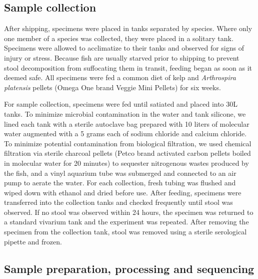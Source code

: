 





\subsection{Sample collection}

After shipping, specimens were placed in tanks separated by species. Where only one member of a species was collected, they were placed in a solitary tank. Specimens were allowed to acclimatize to their tanks and observed for signs of injury or stress. Because fish are usually starved prior to shipping to prevent stool decomposition from suffocating them in transit, feeding began as soon as it deemed safe. All specimens were fed a common diet of kelp and \textit{Arthrospira platensis} pellets (Omega One brand Veggie Mini Pellets) for six weeks. 

For sample collection, specimens were fed until satiated and placed into 30L tanks. To minimize microbial contamination in the water and tank silicone, we lined each tank with a sterile autoclave bag prepared with 10 liters of molecular water augmented with a 5 grams each of sodium chloride and calcium chloride. To minimize potential contamination from biological filtration, we used chemical filtration via sterile charcoal pellets (Petco brand activated carbon pellets boiled in molecular water for 20 minutes) to sequester nitrogenous wastes produced by the fish, and a vinyl aquarium tube was submerged and connected to an air pump to aerate the water. For each collection, fresh tubing was flushed and wiped down with ethanol and dried before use. After feeding, specimens were transferred into the collection tanks and checked frequently until stool was observed. If no stool was observed within 24 hours, the specimen was returned to a standard vivarium tank and the experiment was repeated. After removing the specimen from the collection tank, stool was removed using a sterile serological pipette and frozen. 

\subsection{Sample preparation, processing and sequencing}

